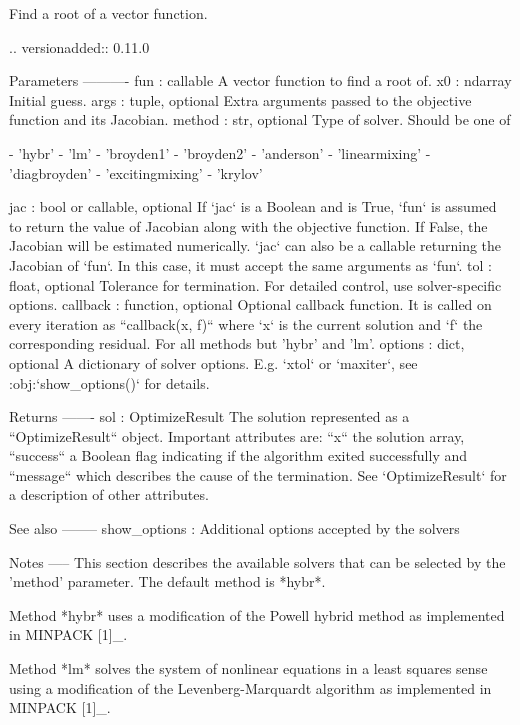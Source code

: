 \begin{DoxyVerb}Find a root of a vector function.

.. versionadded:: 0.11.0

Parameters
----------
fun : callable
    A vector function to find a root of.
x0 : ndarray
    Initial guess.
args : tuple, optional
    Extra arguments passed to the objective function and its Jacobian.
method : str, optional
    Type of solver.  Should be one of

        - 'hybr'
        - 'lm'
        - 'broyden1'
        - 'broyden2'
        - 'anderson'
        - 'linearmixing'
        - 'diagbroyden'
        - 'excitingmixing'
        - 'krylov'

jac : bool or callable, optional
    If `jac` is a Boolean and is True, `fun` is assumed to return the
    value of Jacobian along with the objective function. If False, the
    Jacobian will be estimated numerically.
    `jac` can also be a callable returning the Jacobian of `fun`. In
    this case, it must accept the same arguments as `fun`.
tol : float, optional
    Tolerance for termination. For detailed control, use solver-specific
    options.
callback : function, optional
    Optional callback function. It is called on every iteration as
    ``callback(x, f)`` where `x` is the current solution and `f`
    the corresponding residual. For all methods but 'hybr' and 'lm'.
options : dict, optional
    A dictionary of solver options. E.g. `xtol` or `maxiter`, see
    :obj:`show_options()` for details.

Returns
-------
sol : OptimizeResult
    The solution represented as a ``OptimizeResult`` object.
    Important attributes are: ``x`` the solution array, ``success`` a
    Boolean flag indicating if the algorithm exited successfully and
    ``message`` which describes the cause of the termination. See
    `OptimizeResult` for a description of other attributes.

See also
--------
show_options : Additional options accepted by the solvers

Notes
-----
This section describes the available solvers that can be selected by the
'method' parameter. The default method is *hybr*.

Method *hybr* uses a modification of the Powell hybrid method as
implemented in MINPACK [1]_.

Method *lm* solves the system of nonlinear equations in a least squares
sense using a modification of the Levenberg-Marquardt algorithm as
implemented in MINPACK [1]_.


\end{DoxyVerb}
